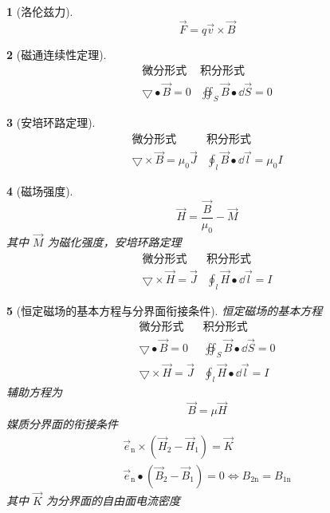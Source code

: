 \documentclass{book}
\theoremstyle{change}
\newtheorem{ti}{}[section]
\begin{document}
\begin{ti}[洛伦兹力]
\[
	\vec{F}=q\vec{v}\times\vec{B}
\]
\end{ti}

\begin{ti}[磁通连续性定理]
\[
\begin{matrix}
\text{微分形式}&\text{积分形式}\\
\bigtriangledown\bullet\vec{B}=0&\oiint_{S}{\vec{B}\bullet\dd \vec{S}}=0
\end{matrix}
\]
\end{ti}

\begin{ti}[安培环路定理]
\[
	\begin{matrix}
	\text{微分形式}&\text{积分形式}\\
	\bigtriangledown\times\vec{B}=\mu_0\vec{J}&\oint_l{\vec{B}\bullet\dd \vec{l}}=\mu_0I
	\end{matrix}
\]
\end{ti}

\begin{ti}[磁场强度]
\[
	\vec{H}=\frac{\vec{B}}{\mu_0}-\vec{M}
\]
其中 $\vec{M}$ 为磁化强度，安培环路定理
\[
	\begin{matrix}
	\text{微分形式}&\text{积分形式}\\
	\bigtriangledown\times\vec{H}=\vec{J}&\oint_l{\vec{H}\bullet\dd \vec{l}}=I
	\end{matrix}
\]
\end{ti}

\begin{ti}[恒定磁场的基本方程与分界面衔接条件]
恒定磁场的基本方程
\[
	\begin{matrix}
	\text{微分形式}&\text{积分形式}\\
	\bigtriangledown\bullet\vec{B}=0&\oiint_{S}{\vec{B}\bullet\dd \vec{S}}=0\\
	\bigtriangledown\times\vec{H}=\vec{J}&\oint_l{\vec{H}\bullet\dd \vec{l}}=I
	\end{matrix}
\]
辅助方程为
\[
	\vec{B}=\mu\vec{H}
\]
媒质分界面的衔接条件
\begin{gather*}
	\vec{e}_{\mathrm{n}}\times(\vec{H}_2-\vec{H}_1)=\vec{K} \\
	\vec{e}_{\mathrm{n}}\bullet(\vec{B}_2-\vec{B}_1)=0\Leftrightarrow B_{2\mathrm{n}}=B_{1\mathrm{n}}
\end{gather*}
其中 $\vec{K}$ 为分界面的自由面电流密度
\end{ti}
\end{document}
